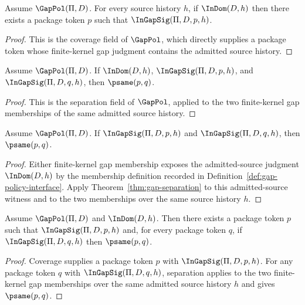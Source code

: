 \begin{theorem}
Assume $\GapPol(\Pi,D)$. For every source history $h$, if $\InDom(D,h)$ then there exists a package token $p$ such that $\InGapSig(\Pi,D,p,h)$.
\end{theorem}
\begin{proof}
This is the coverage field of $\GapPol$, which directly supplies a package token whose finite-kernel gap judgment contains the admitted source history.
\end{proof}

\begin{theorem}
\label{thm:gap-separation}
Assume $\GapPol(\Pi,D)$. If $\InDom(D,h)$, $\InGapSig(\Pi,D,p,h)$, and $\InGapSig(\Pi,D,q,h)$, then $\psame(p,q)$.
\end{theorem}
\begin{proof}
This is the separation field of $\GapPol$, applied to the two finite-kernel gap memberships of the same admitted source history.
\end{proof}

\begin{theorem}
\label{thm:gap-separation-from-memberships}
Assume $\GapPol(\Pi,D)$. If $\InGapSig(\Pi,D,p,h)$ and $\InGapSig(\Pi,D,q,h)$, then $\psame(p,q)$.
\end{theorem}
\begin{proof}
Either finite-kernel gap membership exposes the admitted-source judgment $\InDom(D,h)$ by the membership definition recorded in Definition~\ref{def:gap-policy-interface}. Apply Theorem~\ref{thm:gap-separation} to this admitted-source witness and to the two memberships over the same source history $h$.
\end{proof}

\begin{theorem}
\label{thm:gap-representative-for-admitted-source}
Assume $\GapPol(\Pi,D)$ and $\InDom(D,h)$. Then there exists a package token $p$ such that $\InGapSig(\Pi,D,p,h)$ and, for every package token $q$, if $\InGapSig(\Pi,D,q,h)$ then $\psame(p,q)$.
\end{theorem}
\begin{proof}
Coverage supplies a package token $p$ with $\InGapSig(\Pi,D,p,h)$. For any package token $q$ with $\InGapSig(\Pi,D,q,h)$, separation applies to the two finite-kernel gap memberships over the same admitted source history $h$ and gives $\psame(p,q)$.
\end{proof}

